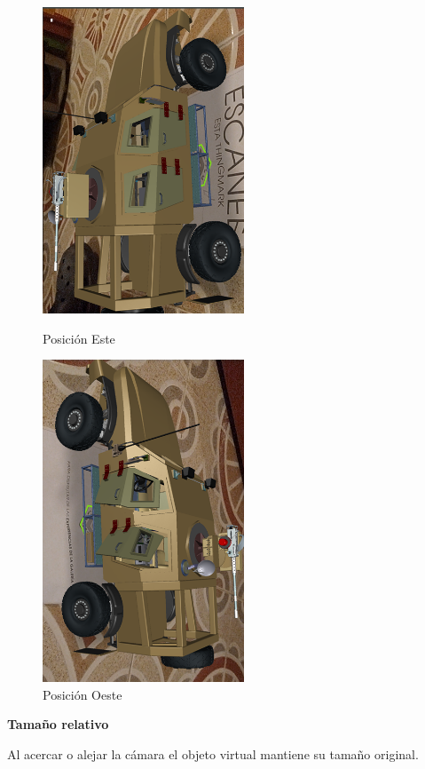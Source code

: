 \begin{figure}[H]
	\begin{minipage}{0.48\textwidth}
		\centering
		\includegraphics[width=6cm]{desarrollo/secciones/pruebas/Vuforia/img/11.png}
		\caption{Posición Este}
		\label{fig:vuforiaEste}
	\end{minipage}\hfill
	\begin{minipage}{0.48\textwidth}
		\centering
		\includegraphics[width=6cm]{desarrollo/secciones/pruebas/Vuforia/img/1.png}
		\caption{Posición Oeste}
		\label{fig:vuforiaOeste}
	\end{minipage}\hfill
\end{figure}



\textbf{Tamaño relativo} \par
Al acercar o alejar la cámara el objeto virtual mantiene su tamaño original.


